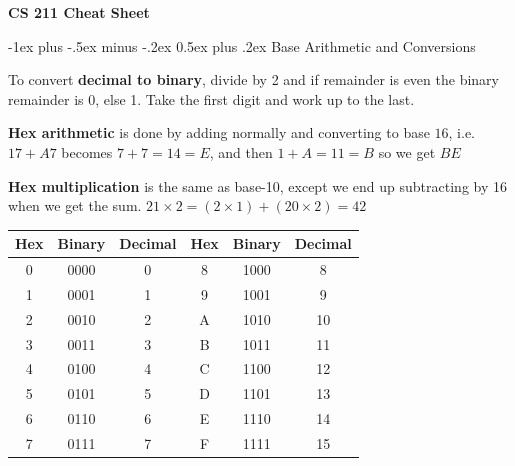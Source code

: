 \documentclass[10pt,landscape]{article}
\makeatletter
\renewcommand{\section}{\@startsection{section}{1}{0mm}%
                                {-1ex plus -.5ex minus -.2ex}%
                                {0.5ex plus .2ex}%
                                {\normalfont\large\bfseries}}
\makeatother
\begin{document}
\raggedright
\footnotesize
\begin{multicols}{3}


\setlength{\premulticols}{1pt}
\setlength{\postmulticols}{1pt}
\setlength{\multicolsep}{1pt}
\setlength{\columnsep}{2pt}

\begin{center}
     \Large{\textbf{CS 211 Cheat Sheet}} \\
\end{center}

\section{Base Arithmetic and Conversions}


To convert {\bf decimal to binary}, divide by 2 and if remainder is even the binary remainder is 0,
else 1. Take the first digit and work up to the last.

{\bf Hex arithmetic} is done by adding normally and converting to base $16$, i.e. $17 + A7$
becomes $7 + 7 = 14 = E$, and then $1 + A = 11 = B$ so we get $BE$

{\bf Hex multiplication} is the same as base-10, except we end up subtracting by
16 when we get the sum. $21 \times 2 = (2 \times 1) + (20 \times 2) = 42$


\begin{center}
\begin{tabular}{|ccc|ccc|}
    \hline
    Hex & Binary & Decimal & Hex & Binary & Decimal \\ \hline
    0   & 0000   & 0       & 8   & 1000   & 8       \\ \hline
    1   & 0001   & 1       & 9   & 1001   & 9       \\ \hline
    2   & 0010   & 2       & A   & 1010   & 10      \\ \hline
    3   & 0011   & 3       & B   & 1011   & 11      \\ \hline
    4   & 0100   & 4       & C   & 1100   & 12      \\ \hline
    5   & 0101   & 5       & D   & 1101   & 13      \\ \hline
    6   & 0110   & 6       & E   & 1110   & 14      \\ \hline
    7   & 0111   & 7       & F   & 1111   & 15      \\ \hline
\end{tabular}
\end{center}


\end{multicols}
\end{document}
